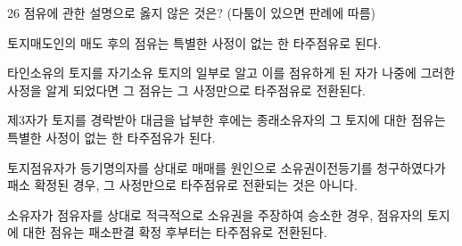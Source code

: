 \begin{question}{26}
점유에 관한 설명으로 옳지 않은 것은? (다툼이 있으면 판례에 따름)
\begin{choices}
  \item 토지매도인의 매도 후의 점유는 특별한 사정이 없는 한 타주점유로 된다.
  \item 타인소유의 토지를 자기소유 토지의 일부로 알고 이를 점유하게 된 자가 나중에 그러한 사정을 알게 되었다면 그 점유는 그 사정만으로 타주점유로 전환된다.
  \item 제3자가 토지를 경락받아 대금을 납부한 후에는 종래소유자의 그 토지에 대한 점유는 특별한 사정이 없는 한 타주점유가 된다.
  \item 토지점유자가 등기명의자를 상대로 매매를 원인으로 소유권이전등기를 청구하였다가 패소 확정된 경우, 그 사정만으로 타주점유로 전환되는 것은 아니다.
  \item 소유자가 점유자를 상대로 적극적으로 소유권을 주장하여 승소한 경우, 점유자의 토지에 대한 점유는 패소판결 확정 후부터는 타주점유로 전환된다.
\end{choices}
\end{question}
